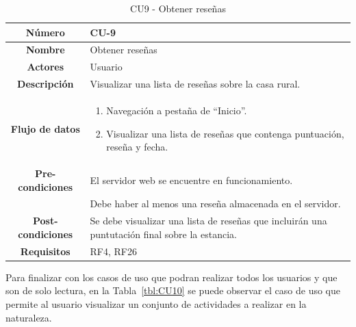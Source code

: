 \begin{table}[h!tb]
	\centering
	\begin{adjustbox}{width=1\textwidth}
	\begin{tabular}{|c|p{\textwidth}|}
		\hline {\bf Número} & CU-9 \\
		\hline {\bf Nombre} & Obtener reseñas\\
		\hline {\bf Actores} & Usuario \\
		\hline {\bf Descripción} & Visualizar una lista de reseñas sobre la casa rural. \\
		\hline {\bf Flujo de datos}
		& 
		\begin{enumerate}
			\item Navegación a pestaña de ``Inicio''.
            \item Visualizar una lista de reseñas que contenga puntuación, reseña y fecha.
   
        \end{enumerate}\\
		\hline {\bf Pre-condiciones}
		& El servidor web se encuentre en funcionamiento. \\
        & Debe haber al menos una reseña almacenada en el servidor. \\
		\hline {\bf Post-condiciones}
		& Se debe visualizar una lista de reseñas que incluirán una puntutación final sobre la estancia. \\
    
		\hline {\bf Requisitos} & RF4, RF26 \\
		\hline 
	\end{tabular}
	\end{adjustbox}
	\caption{CU9 - Obtener reseñas\label{tbl:CU9}}
\end{table}
 Para finalizar con los casos de uso que podran realizar todos los usuarios y que son de solo lectura, en la Tabla~\ref{tbl:CU10} se puede observar el caso de uso que permite al usuario visualizar un conjunto de actividades a realizar en la naturaleza. 
